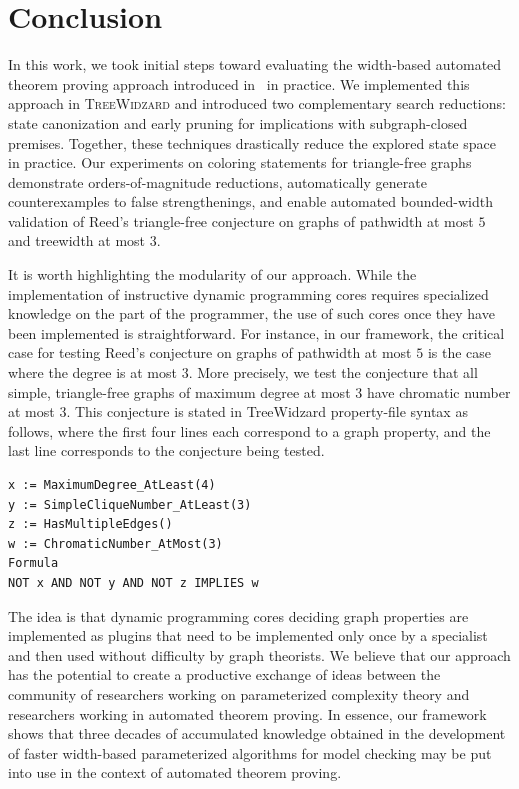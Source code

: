 \documentclass[11pt,a4paper]{article}
\begin{document}
\section{Conclusion}
\label{section:Conclusion}

In this work, we took initial steps toward evaluating the width-based automated theorem proving approach introduced in~\cite{de2023width} in practice. We implemented this approach in \textsc{TreeWidzard} and introduced two complementary search reductions: state canonization and early pruning for implications with subgraph-closed premises. Together, these techniques drastically reduce the explored state space in practice. Our experiments on coloring statements for triangle-free graphs demonstrate orders-of-magnitude reductions, automatically generate counterexamples to false strengthenings, and enable automated bounded-width validation of Reed's triangle-free conjecture on graphs of pathwidth at most $5$ and treewidth at most $3$.

It is worth highlighting the modularity of our approach. While the implementation of instructive dynamic programming cores requires specialized knowledge on the part of the programmer, the use of such cores once they have been implemented is straightforward. For instance, in our framework, the critical case for testing Reed's conjecture on graphs of pathwidth at most $5$ is the case where the degree is at most $3$. More precisely, we test the conjecture that all simple, triangle-free graphs of maximum degree at most $3$ have chromatic number at most $3$. This conjecture is stated in TreeWidzard property-file syntax as follows, where the first four lines each correspond to a graph property, and the last line corresponds to the conjecture being tested.

{\small
\begin{verbatim}
x := MaximumDegree_AtLeast(4)
y := SimpleCliqueNumber_AtLeast(3)
z := HasMultipleEdges()
w := ChromaticNumber_AtMost(3)
Formula
NOT x AND NOT y AND NOT z IMPLIES w
\end{verbatim}
}




The idea is that dynamic programming cores deciding graph properties are implemented as plugins that need to be implemented only once by a specialist and then used without difficulty by graph theorists. We believe that our approach has the potential to create a productive exchange of ideas between the community of researchers working on parameterized complexity theory and researchers working in automated theorem proving. In essence, our framework shows that three decades of accumulated knowledge obtained in the development of faster width-based parameterized algorithms for model checking may be put into use in the context of automated theorem proving.
\end{document}
